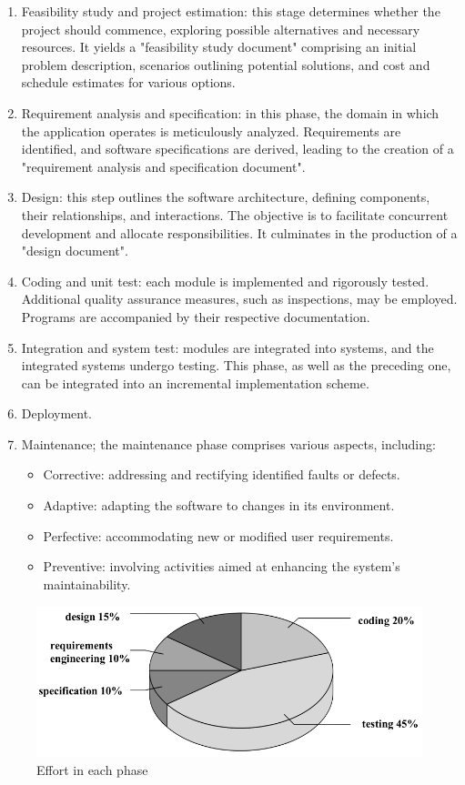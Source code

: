 \documentclass[12pt, a4paper]{report}
\begin{document}
    \begin{enumerate}
        \item Feasibility study and project estimation: this stage determines whether the project should commence, exploring possible alternatives and necessary resources. 
            It yields a "feasibility study document" comprising an initial problem description, scenarios outlining potential solutions, and cost and schedule estimates for various options.
        \item Requirement analysis and specification: in this phase, the domain in which the application operates is meticulously analyzed. 
            Requirements are identified, and software specifications are derived, leading to the creation of a "requirement analysis and specification document". 
        \item Design: this step outlines the software architecture, defining components, their relationships, and interactions. 
            The objective is to facilitate concurrent development and allocate responsibilities. 
            It culminates in the production of a "design document". 
        \item Coding and unit test: each module is implemented and rigorously tested. 
            Additional quality assurance measures, such as inspections, may be employed. 
            Programs are accompanied by their respective documentation.
        \item Integration and system test: modules are integrated into systems, and the integrated systems undergo testing. 
            This phase, as well as the preceding one, can be integrated into an incremental implementation scheme.
        \item Deployment.
        \item Maintenance; the maintenance phase comprises various aspects, including:
            \begin{itemize}
                \item Corrective: addressing and rectifying identified faults or defects.
                \item Adaptive: adapting the software to changes in its environment.
                \item Perfective: accommodating new or modified user requirements.
                \item Preventive: involving activities aimed at enhancing the system's maintainability.
            \end{itemize}
    \end{enumerate}
    \begin{figure}[H]
        \centering
        \includegraphics[width=0.75\linewidth]{images/effort.png}
        \caption{Effort in each phase}
    \end{figure}
    
\end{document}
